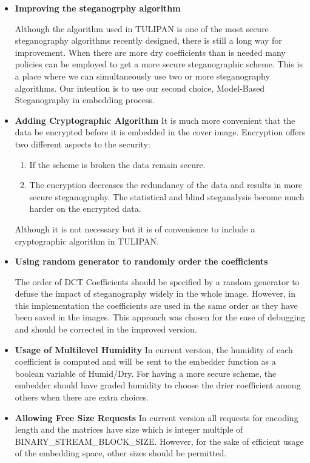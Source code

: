 \begin{itemize}
  \item{\bf Improving the steganogrphy algorithm} 

Although the algorithm used in TULIPAN is one of the most secure steganography algorithms recently designed, there is still a long way for improvement. When there are more dry coefficients than is needed many policies can be employed to get a more secure steganographic scheme. This is a place where we can simultaneously use two or more steganography algorithms. Our intention is to use our second choice, Model-Based Steganography in embedding process.

  \item{\bf Adding Cryptographic Algorithm}
It is much more convenient that the data be encrypted before it is embedded in the cover image. Encryption offers  two different aspects to the security: 
	\begin{enumerate}
	 \item If the scheme is broken the data remain secure.
	 \item  The encryption decreases the redundancy of the data and results in more secure steganography. The statistical and blind steganalysis become much harder on the encrypted data.
	\end{enumerate}
	  Although it is not necessary but it is of convenience to include a cryptographic algorithm in TULIPAN.

  \item {\bf Using random generator to randomly order the coefficients}

	    The order of DCT Coefficients should be specified by a random generator to defuse the impact of steganography widely in the whole image. However, in this implementation the coefficients are used in the same order as they have been saved in the images. This approach was chosen for the ease of debugging and should be corrected in the improved version.
	    
	  \item {\bf Usage of Multilevel Humidity} In current version, the humidity of each coefficient is computed and will be sent to the embedder function as a boolean variable of Humid/Dry. For having a more secure scheme, the embedder should have graded humidity to choose the drier coefficient among others when there are extra choices.

	  \item {\bf Allowing Free Size Requests} 
In current version all requests for encoding length and the matrices have size which is integer multiple of BINARY\_STREAM\_BLOCK\_SIZE. However, for the sake of efficient usage of the embedding space, other sizes should be permitted.


\end{itemize}
